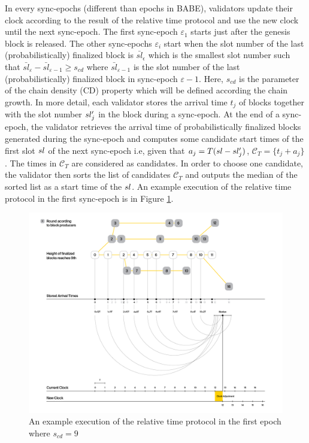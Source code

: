 In every sync-epochs (different than epochs in BABE), validators update their clock according to the result of the relative time protocol and use the new clock until the next sync-epoch. The first sync-epoch $\varepsilon_1$ starts just after the genesis block is released. The other sync-epochs  $\varepsilon_i$ start when the slot number of the last (probabilistically) finalized block is $\bar{sl}_{\epsilon}$ which is the smallest slot number such that  $\bar{sl}_{\varepsilon} - \bar{sl}_{\varepsilon-1} \geq s_{cd}$ where $\bar{sl}_{\varepsilon-1}$ is the slot number of the last (probabilistically) finalized block in sync-epoch $\varepsilon-1$. Here, $s_{cd}$ is the parameter of the chain density (CD) property which will be defined according the chain growth.
In more detail, each validator  stores  the arrival time $ t_j $ of  blocks together with the slot number $sl'_j$ in the block during a sync-epoch. At the end of a sync-epoch, the validator retrieves the arrival time of probabilistically finalized blocks generated during the sync-epoch and computes some candidate start times of the first slot $ sl $ of the next sync-epoch i.e,  given that $ a_j = T(sl - sl'_j)  $,  $\mathcal{C}_T = \{t_j+a_j \}$. The times in $ \mathcal{C}_T $ are considered as candidates. In order to  choose one candidate,  the validator then sorts the list of candidates $ \mathcal{C}_T $ and outputs the median of the sorted list as a start time of the $ sl $. An example execution of the relative time protocol in the first sync-epoch is in Figure \ref{fig:relativetime}.

\begin{figure}[h]
	\centering
	\includegraphics[width=1.\textwidth]{images/BABE3.png}
	\caption{An example execution of the relative time protocol in the first epoch where $s_{cd} = 9$ }
	\label{fig:relativetime}
\end{figure}
